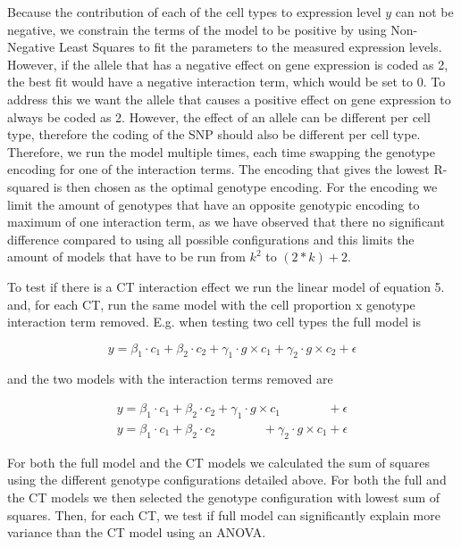 Because the contribution of each of the cell types to expression level $y$ can not be negative, we constrain the terms of the model to be positive by using Non-Negative Least Squares\cite{zhouPreconditionedGAORMethods2009,lawsonSolvingLeastSquares1995} to fit the parameters to the measured expression levels. However, if the allele that has a negative effect on gene expression is coded as 2, the best fit would have a negative interaction term, which would be set to 0. To address this we want the allele that causes a positive effect on gene expression to always be coded as 2. However, the effect of an allele can be different per cell type, therefore the coding of the SNP should also be different per cell type. Therefore, we run the model multiple times, each time swapping the genotype encoding for one of the interaction terms. The encoding that gives the lowest R-squared is then chosen as the optimal genotype encoding. For the encoding we limit the amount of genotypes that have an opposite genotypic encoding to maximum of one interaction term, as we have observed that there no significant difference compared to using all possible configurations and this limits the amount of models that have to be run from $k^2$  to $(2*k)+2$.

To test if there is a CT interaction effect we run the linear model of equation 5. and, for each CT, run the same model with the cell proportion x genotype interaction term removed. E.g. when testing two cell types the full model is

\begin{equation}
y = \beta_{1} \cdot c_{1}+\beta_{2} \cdot c_{2} + \gamma_{1} \cdot g \times c_{1} + \gamma_{2} \cdot g \times c_{2} + \epsilon
\end{equation}

and the two models with the interaction terms removed are 

\begin{equation}
\begin{aligned}
y = \beta_{1} \cdot c_{1} + \beta_{2} \cdot c_{2} + \gamma_{1} \cdot g \times c_{1}\ \ \ \ \ \ \ \ \ \ \ \ \ \ \ \ \  + \epsilon \\
y = \beta_{1} \cdot c_{1} + \beta_{2} \cdot c_{2}\ \ \ \ \ \ \ \ \ \ \ \ \ \ \ \ \ +\gamma_{2} \cdot g \times c_{1} + \epsilon
\end{aligned}
\end{equation}

For both the full model and the CT models we calculated the sum of squares using the different genotype configurations detailed above. For both the full and the CT models we then selected the genotype configuration with lowest sum of squares. Then, for each CT, we test if full model can significantly explain more variance than the CT model using an ANOVA.


